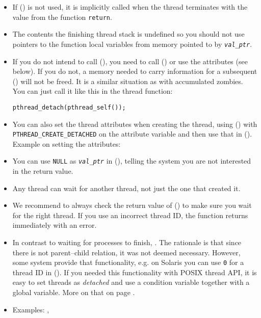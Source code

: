 \begin{itemize}
\item If () is not used, it is implicitly called when the
thread terminates with the value from the function \texttt{return}.
\item The contents the finishing thread stack is undefined so you should not use
pointers to the function local variables from memory pointed to by
\emph{\texttt{val\_ptr}}.
\item If you do not intend to call (), you need to call
() or use the attributes (see below).  If you do not, a
memory needed to carry information for a subsequent () will
not be freed.  It is a similar situation as with accumulated zombies.  You can
just call it like this in the thread function:
\begin{alltt}
pthread\_detach(pthread\_self());
\end{alltt}
\item You can also set the thread attributes when creating the thread, using
() with
\texttt{PTHREAD\_CREATE\_DETACHED} on the attribute variable and then use that
in ().  Example on setting the attributes:
\item You can use \texttt{NULL} as \emph{\texttt{val\_ptr}} in
(), telling the system you are not interested in the return
value.
\item Any thread can wait for another thread, not just the one that created it.
\item We recommend to always check the return value of ()
to make sure you wait for the right thread.  If you use an incorrect thread ID,
the function returns immediately with an error.
\item In contrast to waiting for processes to finish, .  The rationale is that since there is not parent--child
relation, it was not deemed necessary.  However, some system provide that
functionality, e.g.  on Solaris you can use \texttt{0} for a thread ID in
().  If you needed this functionality with POSIX thread API, it
is easy to set threads as \emph{detached} and use a condition variable together
with a global variable.  More on that on page \pageref{CONDITION_VARIABLES}.
\item \label{PTHREAD_JOIN} Examples: ,
\end{itemize}


